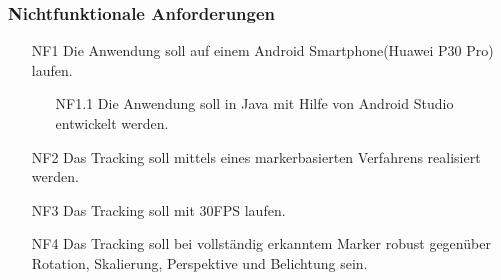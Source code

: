 \subsubsection{Nichtfunktionale Anforderungen}
\begin{itemize}
\item[NF1] Die Anwendung soll auf einem Android Smartphone(Huawei P30 Pro) laufen.
\begin{enumerate}
\item[NF1.1] Die Anwendung soll in Java mit Hilfe von Android Studio entwickelt werden.
\end{enumerate}

\item[NF2] Das Tracking soll mittels eines markerbasierten Verfahrens realisiert werden.
\item[NF3] Das Tracking soll mit 30FPS laufen.
\item[NF4] Das Tracking soll bei vollständig erkanntem Marker robust gegenüber Rotation, Skalierung, Perspektive und Belichtung sein.

\end{itemize}

